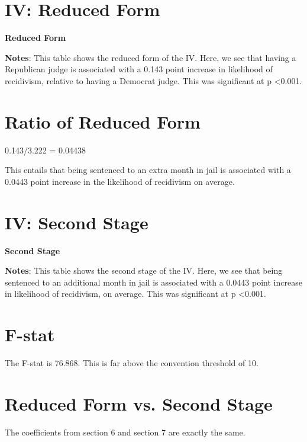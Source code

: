 \documentclass{article}
\begin{document}
\newpage

\section{IV: Reduced Form}
\begin{table}[htbp]
\caption{\textbf{Reduced Form}
\label{tab:EngApproach}}
\center
	
    \center
    \begin{footnotesize}
    \textbf{Notes}: This table shows the reduced form of the IV. Here, we see that having a Republican judge is associated with a 0.143 point increase in likelihood of recidivism, relative to having a Democrat judge. This was significant at p \textless 0.001.
    \end{footnotesize}
\end{table}

\section{Ratio of Reduced Form}
0.143/3.222 = 0.04438

This entails that being sentenced to an extra month in jail is associated with a 0.0443 point increase in the likelihood of recidivism on average.

\newpage

\section{IV: Second Stage}
\begin{table}[htbp]
\caption{\textbf{Second Stage}
\label{tab:EngApproach}}
\center
	
    \center
    \begin{footnotesize}
    \textbf{Notes}: This table shows the second stage of the IV. Here, we see that being sentenced to an additional month in jail is associated with a 0.0443 point increase in likelihood of recidivism, on average. This was significant at p \textless 0.001.
    \end{footnotesize}
\end{table}

\section{F-stat}
The F-stat is 76.868. This is far above the convention threshold of 10.

\section{Reduced Form vs. Second Stage}
The coefficients from section 6 and section 7 are exactly the same.
\end{document}

